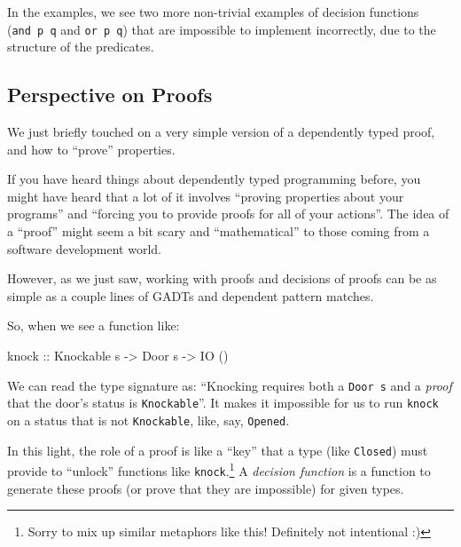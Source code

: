 \documentclass[]{article}
\newenvironment{Shaded}{}{}
\newcommand{\DataTypeTok}[1]{\textcolor[rgb]{0.56,0.13,0.00}{#1}}
\newcommand{\NormalTok}[1]{#1}
\newcommand{\OtherTok}[1]{\textcolor[rgb]{0.00,0.44,0.13}{#1}}
\begin{document}
In the examples, we see two more non-trivial examples of decision functions
(\texttt{and\ p\ q} and \texttt{or\ p\ q}) that are impossible to implement
incorrectly, due to the structure of the predicates.

\hypertarget{perspective-on-proofs}{%
\subsection{Perspective on Proofs}\label{perspective-on-proofs}}

We just briefly touched on a very simple version of a dependently typed proof,
and how to ``prove'' properties.

If you have heard things about dependently typed programming before, you might
have heard that a lot of it involves ``proving properties about your programs''
and ``forcing you to provide proofs for all of your actions''. The idea of a
``proof'' might seem a bit scary and ``mathematical'' to those coming from a
software development world.

However, as we just saw, working with proofs and decisions of proofs can be as
simple as a couple lines of GADTs and dependent pattern matches.

So, when we see a function like:

\begin{Shaded}
\begin{Highlighting}[]
\OtherTok{knock ::} \DataTypeTok{Knockable}\NormalTok{ s }\OtherTok{->} \DataTypeTok{Door}\NormalTok{ s }\OtherTok{->} \DataTypeTok{IO}\NormalTok{ ()}
\end{Highlighting}
\end{Shaded}

We can read the type signature as: ``Knocking requires both a \texttt{Door\ s}
and a \emph{proof} that the door's status is \texttt{Knockable}''. It makes it
impossible for us to run \texttt{knock} on a status that is not
\texttt{Knockable}, like, say, \texttt{\textquotesingle{}Opened}.

In this light, the role of a proof is like a ``key'' that a type (like
\texttt{\textquotesingle{}Closed}) must provide to ``unlock'' functions like
\texttt{knock}.\footnote{Sorry to mix up similar metaphors like this! Definitely
  not intentional :)} A \emph{decision function} is a function to generate these
proofs (or prove that they are impossible) for given types.
\end{document}
